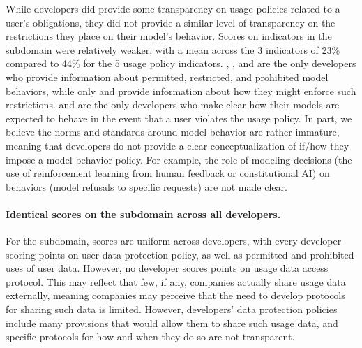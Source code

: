While developers did provide some transparency on usage policies related to a user's obligations, they did not provide a similar level of transparency on the restrictions they place on their model's behavior. 
Scores on indicators in the \modelbehaviorpolicy subdomain were relatively weaker, with a mean across the 3 indicators of 23\% compared to 44\% for the 5 usage policy indicators.
\openai, \anthropic, and \inflection are the only developers who provide information about permitted, restricted, and prohibited model behaviors, while only \inflection and \stability provide information about how they might enforce such restrictions.
\openai and \anthropic are the only developers who make clear how their models are expected to behave in the event that a user violates the usage policy. 
In part, we believe the norms and standards around model behavior are rather immature, meaning that developers do not provide a clear conceptualization of if/how they impose a model behavior policy.
For example, the role of modeling decisions (\eg the use of reinforcement learning from human feedback or constitutional AI) on behaviors (\eg model refusals to specific requests) are not made clear.

\paragraph{Identical scores on the \dataprotection subdomain across all developers.}
For the \dataprotection subdomain, scores are uniform across developers, with every developer scoring points on user data protection policy, as well as permitted and prohibited uses of user data.
However, no developer scores points on usage data access protocol. 
This may reflect that few, if any, companies actually share usage data externally, meaning companies may perceive that the need to develop protocols for sharing such data is limited. 
However, developers' data protection policies include many provisions that would allow them to share such usage data, and specific protocols for how and when they do so are not transparent.

